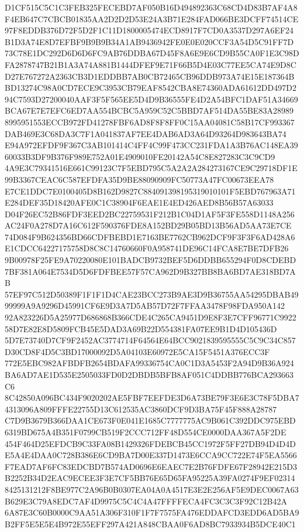 \documentclass[UTF8,fontset=fandol,zihao=-4,a4paper]{ctexart}
\begin{document}
{{D1CF515C5C1C3FEB325FECEBD7AF050B16D494892363C68CD4D83B7AF4A8F4EB647C7CBCB01835AA2D2D2D53E24A3B71E284FAD066BE3DCFF74514CE
97F8EDDB376D72F5D2F1C11D1800005474ECD8917F7CD0A3537D297A6EF24B1D3A74E8D7EFBF9B9B9B34A1AB9436942FE0E0E020CCF3A54D5C91FF7D
73C78E1DC292D6D6D6FC9AB76DDBA67D45F8A6E9E6CD9B55CA0F1E3C98DFA2878747B21B1A3A74A881B1444DFEF9E71F66B5D4E03C77EE5CA74E9D8C
D27E767272A2363CB3D1EDDBB7AB0CB72465CB96DDB973A74E15E187364BBD13274C98A0CD7ECE9C3953CB79EAF8542CBA8E74360ADA61612DD497D2
94C7593D27200040AAF3F5F565EE5D4D9B36555FE4D2A54BFC1DAF51A34669BCA67E7E7EFC6ED7AA554BCBC5A959C52C5BBD7AF514DA55BE83A28989
8995951553ECCB972FD41278FBF6AD8F8F8FF0C15AA04081C58B17CF993367DAB469E3C68DA3C7F1A041837AF7EE4DAB6AD3A64D93264D983643BA74
E94A972EFDF9F367C3AB101414C4FF4C99F473CC231FDA1A3B76AC148EA3960033B3DF9B376F989E752A01E4909010FE20142A54C8E827283C3C9CD9
4A9E3C79341516E661C99123C7F5EBD795C5A2A2A284273167CE9C29718DF1E99B3367CEAC6C587EFDFA35D9BE88090909FC50773A47FC00673EEA78
E7CE1DDC7E0100405D8B162D9827C884091398195319010101F5EBD767963A71E284DEF35D18420AFE0C1C38904F6EAE1E4ED426AED8B56B57A63033
D04F26EC52B86FDF3EED2BC22759531F212B1C04D1AF5F3FE558D1148A256AC24F0A278D7A16C612F590376FDE8A152BD29B05BD13B56AD5AA73E7CE
74D084F9B624356BD66CDFBEBD1E7163BE7762CB962DCF9F3F3F6AD428A6E1CDCC64227175758D8C8C14760660F0A958741DE96C14FCA8E7BE7DFB26
9B00978F25FE9A70220080E101BADCB9732BEF5D6DDBB655294F0D8CDEBD7BF381A064E7534D5D6FDFBEE57F57CA962D9B327BB8BA6BD7AE318BD7AB
57EF97C512D50389F1F1F1D4CAE23BCC273B9AE3D9B36755AA54295DBAB4999999A9A9296D45991CF6E9D3A7D5AB57D72F7FFAA3478F98FDA950A142
92A823226D5A25977D686868B366CDE4C265CA9451D9E8F3E7CFF96771C992258D7E82E8D5809FCB45E5DAD3A69B22D554381FA07EE9B1D4D105436D
5D7E73740D7CF9F2452AC3774714F64564E64BCC9021839595555C5C9C34C857D30CD8F4D5C3BD17000092D5A04103E60972E5CA15F5451A376ECC3F
772E5EBC982AFBDFB2654BDAFA99336754CA0C1D3A5453F2A94D9B36A924BA6AD7AE1D535E2505033FD0D2DBDB5BFB8AF051C4DDBB776BCA293663C6
8C42850A096BC434F9020202AE5FBF7EEFDE3D6A73BE79F3E6E3C78F5DBA74313096A809FFFE22755D13C612535AC3860DCF9D3BA75F45F888A28787
C7D9B3679B366DAA1CE673F0E041E1685C7777775AC9B061C392DDC975EBD6319BD675A4B351F0799CB519F2CCC712FF48D554CE0000DAA367A5F2DE
454F464D25EFDCB9C33FA08B1429326FDEBCB45CC1972F5FF27DB94D4D4DE5A4E4DAA0C728B386E6CD9BA7D00E337D1473E6CCA9CC722E74F5EA5566
F7EAD7AF6FC83EDCBD7B574AD0696E6EAEC7E2B76FDFE67F28942E215D3B2252B34D2EAC9ECEE3F3E7CF5BB76E65D65FA95225A39FA0274F9EF02314
8425131212F8BE977C2A96B0B0307EA04A0A4517E3E2E256AF5E9DEC0067A63B629E3C79A8EDC7AF4D9975C5C4C4A47FFFFECA4FC3C3C3F92C12B42A
6A87E3C60B0000C9AA51A306F310F1F7F7575FA476EDDAFCD3EDD6AD5BA9B2FF5E5E5E4B972E55EFF297A421A848CBAA0F6AD8BC7933934B5DCE40C1
}}
\end{document}
